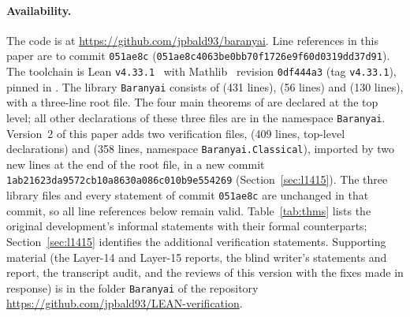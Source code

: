 \documentclass[11pt]{article}
\theoremstyle{definition}
\theoremstyle{remark}
\newcommand{\lean}[1]{\texttt{#1}}
\newcommand{\repo}{https://github.com/jpbald93/baranyai}
\newcommand{\commit}{051ae8c4063be0bb70f1726e9f60d0319dd37d91}
\newcommand{\shortcommit}{051ae8c}
\begin{document}
\paragraph{Availability.}
The code is at \url{\repo}. Line references in this paper are to commit \texttt{\shortcommit}
(\texttt{\commit}). The toolchain is Lean \texttt{v4.33.1}~\cite{Lean4} with Mathlib~\cite{Mathlib}
revision \texttt{0df444a3} (tag \texttt{v4.33.1}), pinned in . The library
\lean{Baranyai} consists of  (431 lines), 
(56 lines) and  (130 lines), with a three-line root file. The four
main theorems of  are declared at the top level; all other declarations of these
three files are in the namespace \lean{Baranyai}. Version~2 of this paper adds two verification
files,  (409 lines, top-level declarations) and
 (358 lines, namespace \lean{Baranyai.Classical}), imported by two
new lines at the end of the root file, in a new commit \texttt{1ab21623da9572cb10a8630a086c010b9e554269}
(Section~\ref{sec:l1415}). The three library files and every statement of commit
\texttt{\shortcommit} are unchanged in that commit, so all line references below remain valid. Table~\ref{tab:thms} lists the original development's informal statements with
their formal counterparts; Section~\ref{sec:l1415} identifies the additional verification statements.
Supporting material (the Layer-14 and Layer-15 reports, the blind writer's statements and report, the transcript audit, and the reviews of this version with the fixes made in response) is in the folder \texttt{Baranyai} of the repository \url{https://github.com/jpbald93/LEAN-verification}.
\end{document}
